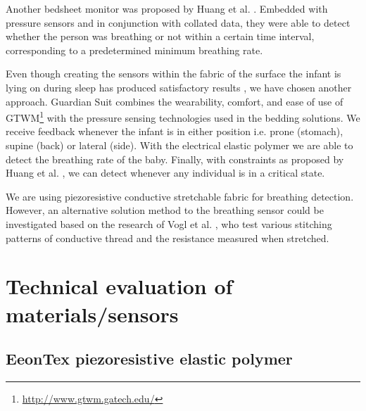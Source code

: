 \documentclass{sigchi-ext}
\begin{document}
Another bedsheet monitor was proposed by Huang et al. \cite{a18-huang}. Embedded with pressure sensors and in conjunction with collated data, they were able to detect whether the person was breathing or not within a certain time interval, corresponding to a predetermined minimum breathing rate.

Even though creating the sensors within the fabric of the surface the infant is lying on during sleep has produced satisfactory results \cite{a18-huang, a33-kroutil}, we have chosen another approach. Guardian Suit combines the wearability, comfort, and ease of use of GTWM\footnote{\url{http://www.gtwm.gatech.edu/}} \cite{p285-fantauzzacoffin} with the pressure sensing technologies used in the bedding solutions. We receive feedback whenever the infant is in either position i.e. prone (stomach), supine (back) or lateral (side). With the electrical elastic polymer we are able to detect the breathing rate of the baby. Finally, with constraints as proposed by Huang et al. \cite{a18-huang}, we can detect whenever any individual is in a critical state.

We are using piezoresistive conductive
stretchable fabric for breathing detection. However, an alternative solution method to the breathing sensor
could be investigated based on the research of Vogl et al. \cite{stretcheband}, who
test various stitching patterns of conductive thread and the resistance measured
when stretched.

\clearpage

\section{Technical evaluation of materials/sensors}

\subsection{EeonTex piezoresistive elastic polymer}
\end{document}

